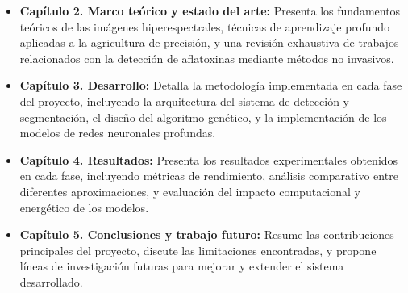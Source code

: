 \begin{itemize}
    \item \textbf{Capítulo 2. Marco teórico y estado del arte:} Presenta los fundamentos teóricos de las imágenes hiperespectrales, técnicas de aprendizaje profundo aplicadas a la agricultura de precisión, y una revisión exhaustiva de trabajos relacionados con la detección de aflatoxinas mediante métodos no invasivos.
    \item \textbf{Capítulo 3. Desarrollo:} Detalla la metodología implementada en cada fase del proyecto, incluyendo la arquitectura del sistema de detección y segmentación, el diseño del algoritmo genético, y la implementación de los modelos de redes neuronales profundas.
    \item \textbf{Capítulo 4. Resultados:} Presenta los resultados experimentales obtenidos en cada fase, incluyendo métricas de rendimiento, análisis comparativo entre diferentes aproximaciones, y evaluación del impacto computacional y energético de los modelos.
    \item \textbf{Capítulo 5. Conclusiones y trabajo futuro:} Resume las contribuciones principales del proyecto, discute las limitaciones encontradas, y propone líneas de investigación futuras para mejorar y extender el sistema desarrollado.
\end{itemize}
